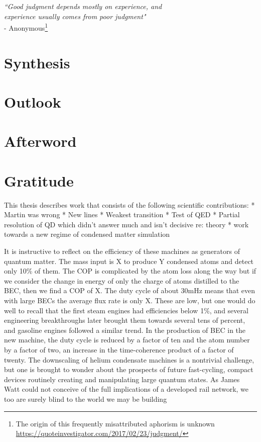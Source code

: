 
\begin{flushright}
\emph{``Good judgment depends mostly on experience, and\\ experience usually comes from poor judgment"} \\- Anonymous\footnote{The origin of this frequently misattributed aphorism is unknown \url{https://quoteinvestigator.com/2017/02/23/judgment/}}
\end{flushright}

\section{Synthesis}\label{sec:synthesis}
\section{Outlook}\label{sec:outlook}
\section{Afterword}\label{sec:afterword}
\section*{Gratitude}\label{sec:gratitude}

This thesis describes work that consists of the following scientific
contributions: * Martin was wrong * New lines * Weakest transition *
Test of QED * Partial resolution of QD which didn't answer much and
isn't decisive re: theory * work towards a new regime of condensed
matter simulation

It is instructive to reflect on the efficiency of these machines as generators of quantum matter. The mass input is X to produce Y condensed atoms and detect only 10\% of them. The COP is complicated by the atom loss along the way but if we consider the change in energy of only the charge of atoms distilled to the BEC, then we find a COP of X. The duty cycle of about 30mHz means that even with large BECs the average flux rate is only X. These are low, but one would do well to recall that the first steam engines had efficiencies below 1\%, and several engineering breakthroughs later brought them towards several tens of percent, and gasoline engines followed a similar trend. In the production of BEC in the new machine, the duty cycle is reduced by a factor of ten and the atom number by a factor of two, an increase in the time-coherence product of a factor of twenty. The downscaling of helium condensate machines is a nontrivial challenge, but one is brought to wonder about the prospects of future fast-cycling, compact devices routinely creating and manipulating large quantum states. As James Watt could not conceive of the full implications of a developed rail network, we too are surely blind to the world we may be building


